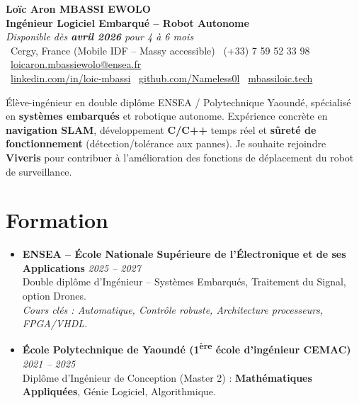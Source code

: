 \documentclass[a4paper,11pt]{article}
\begin{document}
\begin{center}
    {\Large \textbf{Loïc Aron MBASSI EWOLO}} \\ \vspace{4pt}
    \textbf{\large Ingénieur Logiciel Embarqué -- Robot Autonome} \\
    \textit{\small Disponible dès \textbf{avril 2026} pour 4 à 6 mois} \\ \vspace{4pt}
    \small
    \faMapMarker\ Cergy, France (Mobile IDF -- Massy accessible) \quad
    \faPhone\ (+33) 7 59 52 33 98 \quad
    \faEnvelope\ \href{mailto:loicaron.mbassiewolo@ensea.fr}{loicaron.mbassiewolo@ensea.fr} \\ \vspace{2pt}
    \faLinkedin\ \href{https://www.linkedin.com/in/loic-mbassi/}{linkedin.com/in/loic-mbassi} \quad
    \faGithub\ \href{https://github.com/Nameless0l}{github.com/Nameless0l} \quad
    \faGlobe\ \href{https://mbassiloic.tech}{mbassiloic.tech}
\end{center}

\vspace{-6pt}

\noindent\small{Élève-ingénieur en double diplôme ENSEA / Polytechnique Yaoundé, spécialisé en \textbf{systèmes embarqués} et robotique autonome. Expérience concrète en \textbf{navigation SLAM}, développement \textbf{C/C++} temps réel et \textbf{sûreté de fonctionnement} (détection/tolérance aux pannes). Je souhaite rejoindre \textbf{Viveris} pour contribuer à l'amélioration des fonctions de déplacement du robot de surveillance.}

\section{Formation}
\begin{itemize}[leftmargin=*, label=\tiny$\bullet$, nosep]
    \item \textbf{ENSEA -- École Nationale Supérieure de l'Électronique et de ses Applications} \hfill \textit{2025 -- 2027} \\
    \small{Double diplôme d'Ingénieur -- Systèmes Embarqués, Traitement du Signal, option Drones.} \\
    \textit{\small{Cours clés : Automatique, Contrôle robuste, Architecture processeurs, FPGA/VHDL.}}
    \item \textbf{École Polytechnique de Yaoundé (1\textsuperscript{ère} école d'ingénieur CEMAC)} \hfill \textit{2021 -- 2025} \\
    \small{Diplôme d'Ingénieur de Conception (Master 2) : \textbf{Mathématiques Appliquées}, Génie Logiciel, Algorithmique.}
\end{itemize}
\end{document}
